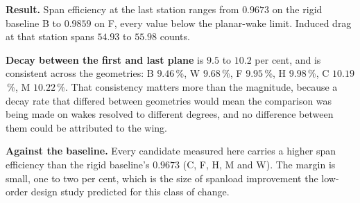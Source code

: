 \textbf{Result.} Span efficiency at the last station ranges from $0.9673$ on the rigid baseline B to $0.9859$ on F, every value below the planar-wake limit. Induced drag at that station spans $54.93$ to $55.98$ counts.

\textbf{Decay between the first and last plane} is $9.5$ to $10.2$ per cent, and is consistent across the geometries: B $9.46$\,\%, W $9.68$\,\%, F $9.95$\,\%, H $9.98$\,\%, C $10.19$\,\%, M $10.22$\,\%. That consistency matters more than the magnitude, because a decay rate that differed between geometries would mean the comparison was being made on wakes resolved to different degrees, and no difference between them could be attributed to the wing.

\textbf{Against the baseline.} Every candidate measured here carries a higher span efficiency than the rigid baseline's $0.9673$ (C, F, H, M and W). The margin is small, one to two per cent, which is the size of spanload improvement the low-order design study predicted for this class of change.
